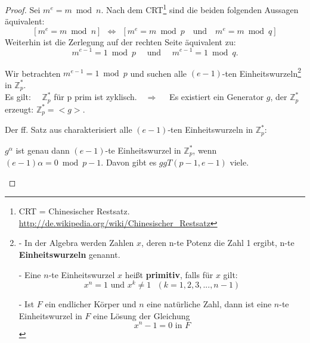 \begin{refsegment}
\begin{proof}{}%
Sei $m^e = m \bmod n.$
Nach dem CRT\footnote{%
  CRT = Chinesischer Restsatz.
  \url{http://de.wikipedia.org/wiki/Chinesischer_Restsatz}
}
sind die beiden folgenden Aussagen äquivalent:\\
$$ [ m^e = m \bmod n ]~~ \Leftrightarrow ~~[ m^{e} = m \bmod p \text{ ~~und~~  } m^{e} = m \bmod q ] $$
Weiterhin ist die Zerlegung auf der rechten Seite äquivalent zu:
$$m^{e-1} = 1 \bmod p \text{ ~~~und~~~ } m^{e-1} = 1 \bmod q. $$


 Wir betrachten  $m^{e-1} = 1 \bmod p $ und  suchen alle $(e-1)$-ten
Einheitswurzeln\footnote{%
- In der Algebra werden Zahlen $x$, deren n-te Potenz die Zahl 1 ergibt, n-te \textbf{Einheitswurzeln} genannt.

- Eine $n$-te Einheitswurzel $x$ heißt \textbf{primitiv}, falls für $x$ gilt:
 $$x^{n} = 1  \text{ und }   x^{k} \neq 1 ~~~(k = 1,2, 3, ..., n-1)$$


- Ist $F$ ein endlicher Körper und $n$ eine natürliche Zahl, dann ist eine
$n$-te Einheitswurzel in $F$ eine Lösung der Gleichung $$ x^{n}-1 = 0 \text{ in } F $$
}
in $\mathbb{Z}_p^{*}.$\\
Es gilt:~~ $\mathbb{Z}_p^{*}$ für p prim ist zyklisch.~~$\Rightarrow $~~
Es existiert ein Generator $g$, der $\mathbb{Z}_p^{*}$ erzeugt: $\mathbb{Z}_p^{*}=<g>$.

 Der ff. Satz aus \cite[S. 69]{Katzenbeisser2001} charakterisiert alle $(e-1)$-ten Einheitswurzeln in $\mathbb{Z}_p^{*}$:

\begin{satz}\label{nt-katzenbeisser-Anzahl-Einheitswurzeln}
  $g^{\alpha}$ ist genau dann $(e-1)$-te Einheitswurzel in $\mathbb{Z}_p^{*}$,
  wenn $(e-1)\alpha = 0\bmod p-1.$ Davon gibt es $ggT(p-1, e-1)$ viele.
\end{satz}


\end{proof}
\end{refsegment}
